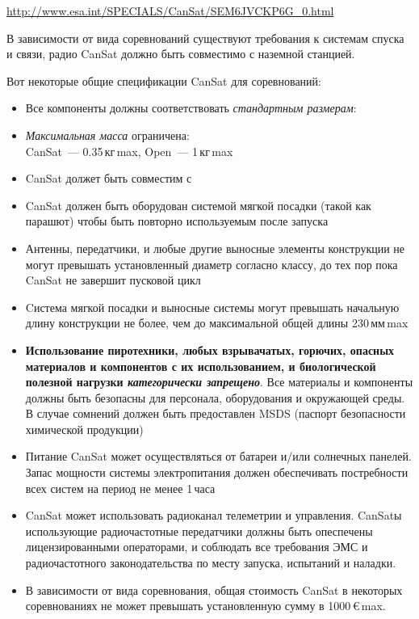\label{can}\secdown

\url{http://www.esa.int/SPECIALS/CanSat/SEM6JVCKP6G_0.html}

\noindent
В зависимости от вида соревнований существуют требования к системам спуска и связи, 
радио CanSat должно быть совместимо с наземной станцией.

\bigskip
Вот некоторые общие спецификации CanSat для соревнований:

\begin{itemize}
\item Все компоненты должны соответствовать \emph{стандартным размерам}:
\item \emph{Максимальная масса} ограничена:\\CanSat\ --- 0.35\,кг\,max, Open\ --- 1\,кг\,max
\item CanSat должет быть совместим с 
\item CanSat должен быть оборудован системой мягкой посадки (такой как парашют) чтобы быть повторно используемым после запуска
\item Антенны, передатчики, и любые другие выносные элементы конструкции не могут превышать установленный диаметр согласно классу,
до тех пор пока CanSat не завершит пусковой цикл
\item Cистема мягкой посадки и выносные системы могут превышать начальную длину конструкции не более, чем до максимальной общей длины 230\,мм\,max
\item \textbf{Использование пиротехники, любых взрывачатых, горючих, о\-пасных материалов и компонентов с их использованием,
и биологической полезной нагрузки \emph{категорически запрещено}}. Все материалы и компоненты должны быть безопасны
для персонала, оборудования и окружающей среды. В случае сомнений должен быть предоставлен MSDS (паспорт безопасности химической продукции)
\item Питание CanSat может осуществляться от батареи и/или солнечных панелей. 
Запас мощности системы электропитания должен обеспечивать постребности всех систем на период не менее 1\,часа
\item CanSat может использовать радиоканал телеметрии и управления. CanSatы использующие радиочастотные передатчики
должны быть опеспечены лицензированными операторами, и соблюдать все требования ЭМС и радиочастотного законодательства по месту запуска, испытаний и наладки.
\item В зависимости от вида соревнования, общая стоимость CanSat в некоторых соревнованиях не может превышать установленную сумму в 1000\,\euro\,max.
\end{itemize}

\secup

